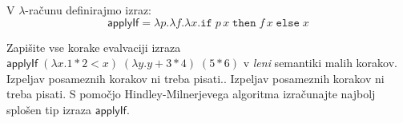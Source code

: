 \documentclass[arhiv]{../izpit}
\begin{document}
\newcommand{\bnfis}{\mathrel{{:}{:}{=}}}
\newcommand{\bnfor}{\;\mid\;}
\newcommand{\fun}[2]{\lambda #1. #2}
\newcommand{\minfix}[2]{\mu #1. #2}
\newcommand{\conditional}[3]{\mathtt{if}\;#1\;\mathtt{then}\;#2\;\mathtt{else}\;#3}
\newcommand{\whileloop}[2]{\mathtt{while}\;#1\;\mathtt{do}\;#2}
\newcommand{\recfun}[3]{\mathtt{rec}\;#1\;#2. #3}
\newcommand{\boolty}{\mathtt{bool}}
\newcommand{\intty}{\mathtt{int}}
\newcommand{\funty}[2]{#1 \to #2}
\newcommand{\tru}{\mathtt{true}}
\newcommand{\fls}{\mathtt{false}}
\newcommand{\unt}{\hbox{\texttt{()}}}
\newcommand{\tbool}{\mathtt{bool}}
\newcommand{\tand}{\mathbin{\mathtt{and}}}
\newcommand{\tandalso}{\mathbin{\mathtt{andalso}}}
\newcommand{\imp}{\textsc{imp}}
\newcommand{\skp}{\mathtt{skip}}
\newcommand{\itp}[1]{\llbracket #1 \rrbracket}
\makeatletter
\newcommand{\nadaljevanje}{\dodatek{\newpage\noindent\emph{(\@sloeng{nadaljevanje rešitve \arabic{naloga}. naloge}{continuation of the answer to question \arabic{naloga}})}}}
\makeatother
{}


\naloga[\tocke{20}]

V $\lambda$-računu definirajmo izraz:
\[
  \mathsf{applyIf} = \fun{p} \fun{f} \fun{x} \conditional{p \, x}{f \, x}{x}
\]

\podnaloga[\tocke{10}] Zapišite vse korake evalvaciji izraza $\mathsf{applyIf} \; (\fun{x} 1 * 2 < x) \; (\fun{y} y + 3 * 4) \; (5 * 6)$ v \emph{leni} semantiki malih korakov. Izpeljav posameznih korakov ni treba pisati.. Izpeljav posameznih korakov ni treba pisati.
\podnaloga[\tocke{10}] S pomočjo Hindley-Milnerjevega algoritma izračunajte najbolj splošen tip izraza $\mathsf{applyIf}$.
\end{document}

